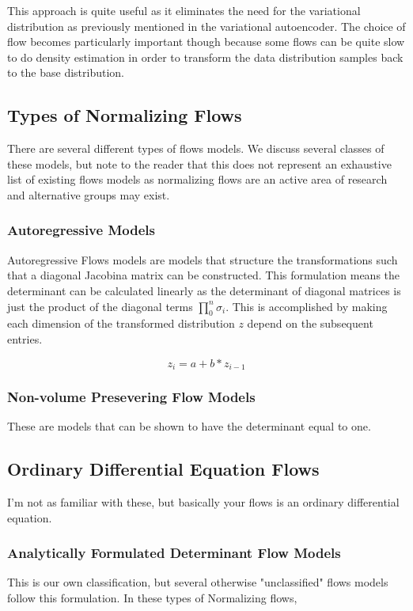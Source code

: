 This approach is quite useful as it eliminates the need for the variational distribution as previously mentioned in the variational autoencoder. The choice of flow becomes particularly important though because some flows can be quite slow to do density estimation in order to transform the data distribution samples back to the base distribution. 




\subsection{Types of Normalizing Flows}

There are several different types of flows models. We discuss several classes of these models, but note to the reader that this does not represent an exhaustive list of existing flows models as normalizing flows are an active area of research and alternative groups may exist. 

\subsubsection{Autoregressive Models}
Autoregressive Flows models are models that structure the transformations such that a diagonal Jacobina matrix can be constructed. This formulation means the determinant can be calculated linearly as the determinant of diagonal matrices is just the product of the diagonal terms $\prod_{0}^{n} \sigma_{i}$. This is accomplished by making each dimension of the transformed distribution $z$ depend on the subsequent entries.



\begin{equation}
	 z_{i} = a + b * z_{i-1}		
\end{equation}

\subsubsection{Non-volume Presevering Flow Models} 
These are models that can be shown to have the determinant equal to one. 

\subsection{Ordinary Differential Equation Flows}

I'm not as familiar with these, but basically your flows is an ordinary differential equation. 

\subsubsection{Analytically Formulated Determinant Flow Models}
This is our own classification, but several otherwise "unclassified" flows models follow this formulation. In these types of Normalizing flows,


